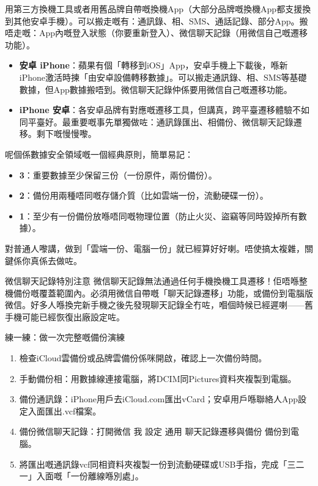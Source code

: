 
用第三方換機工具或者用舊品牌自帶嘅換機App（大部分品牌嘅換機App都支援換到其他安卓手機）。可以搬走嘅有：通訊錄、相、SMS、通話記錄、部分App。搬唔走嘅：App內嘅登入狀態（你要重新登入）、微信聊天記錄（用微信自己嘅遷移功能）。


\begin{itemize}
  \item \textbf{安卓 iPhone}：蘋果有個「轉移到iOS」App，安卓手機上下載後，喺新iPhone激活時揀「由安卓設備轉移數據」。可以搬走通訊錄、相、SMS等基礎數據，但App數據搬唔到。微信聊天記錄仲係要用微信自己嘅遷移功能。
  \item \textbf{iPhone 安卓}：各安卓品牌有對應嘅遷移工具，但講真，跨平臺遷移體驗不如同平臺好。最重要嘅事先單獨做咗：通訊錄匯出、相備份、微信聊天記錄遷移。剩下嘅慢慢嚟。
\end{itemize}


呢個係數據安全領域嘅一個經典原則，簡單易記：

\begin{itemize}
  \item \textbf{3}：重要數據至少保留三份（一份原件，兩份備份）。
  \item \textbf{2}：備份用兩種唔同嘅存儲介質（比如雲端一份，流動硬碟一份）。
  \item \textbf{1}：至少有一份備份放喺唔同嘅物理位置（防止火災、盜竊等同時毀掉所有數據）。
\end{itemize}

對普通人嚟講，做到「雲端一份、電腦一份」就已經算好好喇。唔使搞太複雜，關鍵係你真係去做咗。

\begin{tcbwarn}{微信聊天記錄特別注意}
微信聊天記錄無法通過任何手機換機工具遷移！佢唔喺整機備份嘅覆蓋範圍內。必須用微信自帶嘅「聊天記錄遷移」功能，或備份到電腦版微信。好多人喺換完新手機之後先發現聊天記錄全冇咗，嗰個時候已經遲喇——舊手機可能已經恢復出廠設定咗。

\end{tcbwarn}

\begin{tcbpractice}{練一練：做一次完整嘅備份演練}
\begin{enumerate}
  \item 檢查iCloud雲備份或品牌雲備份係咪開啟，確認上一次備份時間。
  \item 手動備份相：用數據線連接電腦，將DCIM同Pictures資料夾複製到電腦。
  \item 備份通訊錄：iPhone用戶去iCloud.com匯出vCard；安卓用戶喺聯絡人App設定入面匯出.vcf檔案。
  \item 備份微信聊天記錄：打開微信 我 設定 通用 聊天記錄遷移與備份 備份到電腦。
  \item 將匯出嘅通訊錄vcf同相資料夾複製一份到流動硬碟或USB手指，完成「三二一」入面嘅「一份離線喺別處」。
\end{enumerate}

\end{tcbpractice}
